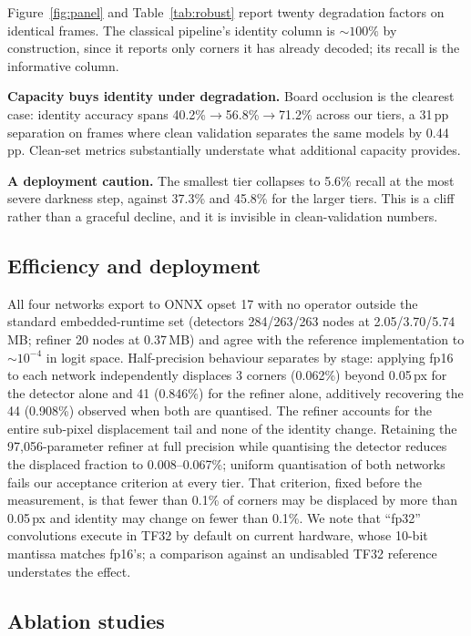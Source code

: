 \documentclass[10pt,twocolumn,letterpaper]{article}
\begin{document}
Figure~\ref{fig:panel} and Table~\ref{tab:robust} report twenty degradation factors on identical
frames. The classical pipeline's identity column is ${\sim}100\%$ by construction, since it reports
only corners it has already decoded; its recall is the informative column.

\textbf{Capacity buys identity under degradation.} Board occlusion is the clearest case: identity
accuracy spans 40.2\%$\rightarrow$56.8\%$\rightarrow$71.2\% across our tiers, a 31\,pp separation on
frames where clean validation separates the same models by 0.44\,pp. Clean-set metrics
substantially understate what additional capacity provides.

\textbf{A deployment caution.} The smallest tier collapses to 5.6\% recall at the most severe
darkness step, against 37.3\% and 45.8\% for the larger tiers. This is a cliff rather than a
graceful decline, and it is invisible in clean-validation numbers.

\subsection{Efficiency and deployment}
\label{sec:deploy}

All four networks export to ONNX opset 17 with no operator outside the standard embedded-runtime
set (detectors 284/263/263 nodes at 2.05/3.70/5.74\,MB; refiner 20 nodes at 0.37\,MB) and agree
with the reference implementation to ${\sim}10^{-4}$ in logit space. Half-precision behaviour
separates by stage: applying fp16 to each network independently displaces 3 corners (0.062\%)
beyond 0.05\,px for the detector alone and 41 (0.846\%) for the refiner alone, additively
recovering the 44 (0.908\%) observed when both are quantised. The refiner accounts for the entire
sub-pixel displacement tail and none of the identity change. Retaining the 97,056-parameter refiner
at full precision while quantising the detector reduces the displaced fraction to 0.008--0.067\%;
uniform quantisation of both networks fails our acceptance criterion at every tier. That
criterion, fixed before the measurement, is that fewer than 0.1\% of corners may be displaced by
more than 0.05\,px and identity may change on fewer than 0.1\%. We note that
``fp32'' convolutions execute in TF32 by default on current hardware, whose 10-bit mantissa matches
fp16's; a comparison against an undisabled TF32 reference understates the effect.

\subsection{Ablation studies}
\label{sec:ablation}
\end{document}
